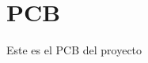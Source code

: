 \documentclass[../informe_krapp.tex]{subfiles}
\begin{document}
\graphicspath{{../images/}}
\section{PCB}
Este es el PCB del proyecto
\end{document}
